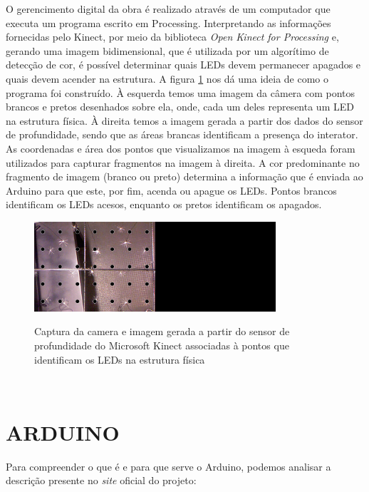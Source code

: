 O gerencimento digital da obra é realizado através de um computador que executa um programa escrito em Processing. Interpretando as informações fornecidas pelo Kinect, por meio da biblioteca \textit{Open Kinect for Processing} e, gerando uma imagem bidimensional, que é utilizada por um algorítimo de detecção de cor, é possível determinar quais LEDs devem permanecer apagados e quais devem acender na estrutura. A figura \ref{fig:script} nos dá uma ideia de como o programa foi construído. À esquerda temos uma imagem da câmera com pontos brancos e pretos desenhados sobre ela, onde, cada um deles representa um LED na estrutura física. À direita temos a imagem gerada a partir dos dados do sensor de profundidade, sendo que as áreas brancas identificam a presença do interator. As coordenadas e área dos pontos que visualizamos na imagem à esqueda foram utilizados para capturar fragmentos na imagem à direita. A cor predominante no fragmento de imagem (branco ou preto) determina a informação que é enviada ao Arduino para que este, por fim, acenda ou apague os LEDs. Pontos brancos identificam os LEDs acesos, enquanto os pretos identificam os apagados.


\begin{figure}[H]
    \centering
    \caption{Captura da camera e imagem gerada a partir do sensor de profundidade do Microsoft Kinect associadas à pontos que identificam os LEDs na estrutura física}
	\vspace*{0,2cm}
    \includegraphics[width=0.8\textwidth]{./04-figuras/script}
    \label{fig:script}
\end{figure}
\vspace*{-0,9cm}
{\raggedright {}}\\


\section{ARDUINO}

Para compreender o que é e para que serve o Arduino, podemos analisar a descrição presente no \textit{site} oficial do projeto:

